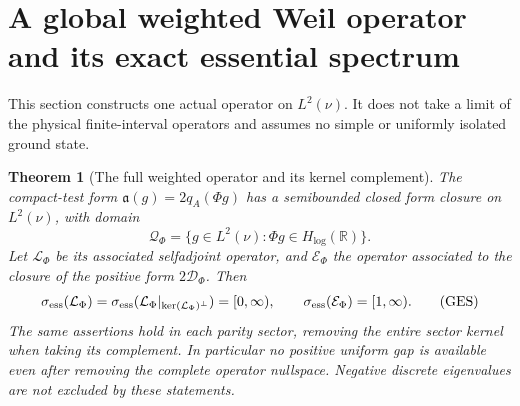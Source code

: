 \documentclass[11pt]{article}
\newtheorem{theorem}{Theorem}
\theoremstyle{remark}\newtheorem{remark}[theorem]{Remark}
\newcommand{\R}{\mathbb R}
\begin{document}
\section{A global weighted Weil operator and its exact essential spectrum}
This section constructs one actual operator on $L^2(\nu)$.
It does not take a limit of the physical finite-interval operators
and assumes no simple or uniformly isolated ground state.

\begin{theorem}[The full weighted operator and its kernel complement]
\label{thm:theta-global-spectrum}
The compact-test form $\mathfrak a(g)=2q_A(\Phi g)$ has a
semibounded closed form closure on $L^2(\nu)$, with domain
\[
 \mathcal Q_\Phi=\{g\in L^2(\nu):\Phi g\in H_{\log}(\R)\}.
\]
Let $\mathcal L_\Phi$ be its associated selfadjoint operator,
and $\mathcal E_\Phi$ the operator associated to the closure
of the positive form $2\mathcal D_\Phi$. Then
\[
 \sigma_{\rm ess}(\mathcal L_\Phi)=
 \sigma_{\rm ess}(\mathcal L_\Phi|_{\ker(\mathcal L_\Phi)^\perp})
 =[0,\infty),\qquad
 \sigma_{\rm ess}(\mathcal E_\Phi)=[1,\infty).             \tag{GES}
\]
The same assertions hold in each parity sector, removing the
entire sector kernel when taking its complement.
In particular no positive uniform gap is available even after
removing the complete operator nullspace. Negative discrete
eigenvalues are not excluded by these statements.
\end{theorem}
\end{document}
